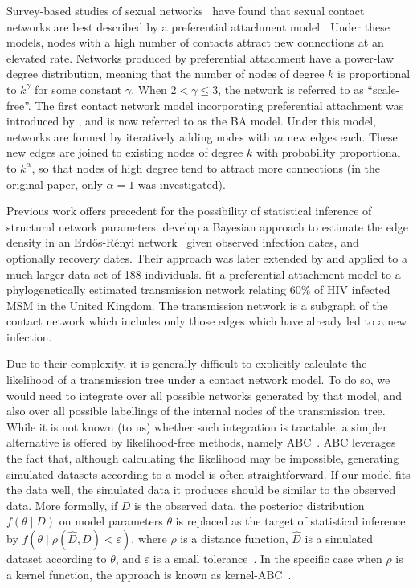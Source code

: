 \documentclass[12pt]{article}\usepackage[]{graphicx}\usepackage[]{color}
\begin{document}
Survey-based studies of sexual networks~\autocite{liljeros2001web,
schneeberger2004scale} have found that sexual contact networks are best
described by a preferential attachment model \autocite[although there has been
some disagreement, see][]{jones2003assessment}. Under these models, nodes with
a high number of contacts attract new connections at an elevated rate. Networks
produced by preferential attachment have a power-law degree distribution,
meaning that the number of nodes of degree $k$ is proportional to $k^\gamma$
for some constant $\gamma$. When $2 < \gamma \leq 3$, the network is referred
to as ``scale-free''. The first contact network model incorporating
preferential attachment was introduced by \textcite{barabasi1999emergence}, and
is now referred to as the \gls{BA} model. Under this model, networks are formed
by iteratively adding nodes with $m$ new edges each. These new edges are joined
to existing nodes of degree $k$ with probability proportional to $k^\alpha$, so
that nodes of high degree tend to attract more connections (in the original
paper, only $\alpha = 1$ was investigated).

Previous work offers precedent for the possibility of statistical inference of
structural network parameters. \textcite{britton2002bayesian} develop a
Bayesian approach to estimate the edge density in an Erd\H{o}s-R\'enyi
network~\autocite{erdos1960evolution} given observed infection dates, and
optionally recovery dates. Their approach was later extended by
\textcite{groendyke2011bayesian} and applied to a much larger data set of 188
individuals. \textcite{brown2011transmission} fit a preferential attachment
model to a phylogenetically estimated transmission network relating 60\% of HIV
infected \gls{MSM} in the United Kingdom. The transmission network is a
subgraph of the contact network which includes only those edges which have
already led to a new infection. 

Due to their complexity, it is generally difficult to explicitly calculate the
likelihood of a transmission tree under a contact network model. To do so, we
would need to integrate over all possible networks generated by that model, and
also over all possible labellings of the internal nodes of the transmission
tree. While it is not known (to us) whether such integration is tractable, a
simpler alternative is offered by likelihood-free methods, namely
\gls{ABC}~\autocite{rubin1984bayesianly, tavare1997inferring}. \gls{ABC}
leverages the fact that, although calculating the likelihood may be impossible,
generating simulated datasets according to a model is often straightforward. If
our model fits the data well, the simulated data it produces should be similar
to the observed data. More formally, if $D$ is the observed data, the posterior
distribution $f(\theta \mid D)$ on model parameters $\theta$ is replaced as the
target of statistical inference by $f(\theta \mid \rho(\hat{D}, D) <
\varepsilon)$, where $\rho$ is a distance function, $\hat{D}$ is a simulated
dataset according to $\theta$, and $\varepsilon$ is a small
tolerance~\autocite{sunnaker2013approximate}. In the specific case when $\rho$
is a kernel function, the approach is known as
kernel-\gls{ABC}~\autocite{nakagome2013kernel}.
\end{document}
